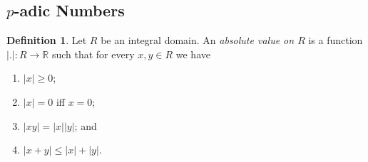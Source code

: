 \documentclass[12pt]{article}
\theoremstyle{definition}
\newtheorem{dfn}[thm]{Definition}
\theoremstyle{remark}
\begin{document}
    \subsection{\texorpdfstring{$p$}{p}-adic Numbers}

    
    
    \begin{dfn}
        Let $R$ be an integral domain. An \emph{absolute value on $R$} is a function $|.|\colon R\to \mathbb{R}$ such that for every $x,y\in R$ we have
        \begin{enumerate}[label=(\alph*)]
            \item $|x|\geq 0$;
            \item $|x|=0$ iff $x=0$;
            \item $|xy|=|x||y|$; and
            \item $|x+y|\leq |x|+|y|$.
        \end{enumerate}
    \end{dfn}
\end{document}
